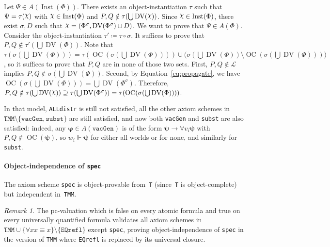 \documentclass[11pt]{article}
\DeclareRobustCommand{\Chi}{{\mathpalette\irchi\relax}}
\newcommand*{\irchi}[2]{\raisebox{\depth}{$#1\chi$}}%
\renewcommand*{\phi}{\varphi}
\newcommand*{\calL}{\mathcal{L}}
\DeclareMathOperator{\DV}{DV}
\DeclareMathOperator{\OC}{OC}
\DeclareMathOperator{\Inst}{Inst}
\theoremstyle{plain}
\theoremstyle{definition}
\theoremstyle{remark}
\newtheorem{remark}[theorem]{Remark}
\begin{document}
Let $\Psi \in A(\Inst(\Phi))$.
There exists an object-instantiation $\tau$ such that $\Psi = \tau(\Chi)$ with $\Chi \in \Inst(\Phi)$
and $P, Q \notin \tau(\bigcup \DV(\Chi))$.
Since $\Chi \in \Inst(\Phi)$, there exist $\sigma, D$ such that
$\Chi = (\Phi^\sigma, \DV(\Phi^\sigma) \cup D)$.
We want to prove that $\Psi \in A(\Phi)$.
Consider the object-instantiation $\tau' \coloneqq \tau \circ \sigma$.
It suffices to prove that $P, Q \notin \tau'(\bigcup \DV(\Phi))$.
Note that $\tau(\sigma(\bigcup \DV(\Phi))) = \tau(\OC(\sigma(\bigcup \DV(\Phi)))) \cup
\bigl( \sigma(\bigcup \DV(\Phi)) \setminus \OC(\sigma(\bigcup \DV(\Phi))) \bigr)$,
so it suffices to prove that $P, Q$ are in none of those two sets.
First, $P, Q \notin \calL$ implies $P, Q \notin \sigma(\bigcup \DV(\Phi))$.
Second, by Equation~\eqref{eq:propagate}, we have
$\OC(\sigma(\bigcup \DV(\Phi))) = \bigcup \DV(\Phi^\sigma)$.
Therefore, $P, Q \notin \tau(\bigcup \DV(\Chi)) \supseteq \tau(\bigcup \DV(\Phi^\sigma))
= \tau(\OC(\sigma(\bigcup \DV(\Phi))))$.



In that model, \texttt{ALLdistr} is still not satisfied, all the other axiom schemes in
$\texttt{TMM} \setminus \{\texttt{vacGen}, \texttt{subst}\}$ are still satisfied, and now both
\texttt{vacGen} and \texttt{subst} are also satisfied: indeed, any $\bm\phi \in A(\texttt{vacGen})$
is of the form $\bm\psi \to \forall v_i \bm\psi$ with $P, Q \notin \OC(\bm\psi)$, so
$w_i \Vdash \bm\psi$ for either all worlds or for none, and similarly for \texttt{subst}.


\paragraph{Object-independence of \texttt{spec}}

The axiom scheme \texttt{spec} is object-provable from~\texttt{T} (since~\texttt{T} is
object-complete) but independent in~\texttt{TMM}.

\begin{remark}
The pc-valuation which is false on every atomic formula and true on every universally quantified
formula validates all axiom schemes in
$\texttt{TMM} \cup \{ \forall x x \equiv x \} \setminus \{ \texttt{EQrefl} \}$ except \texttt{spec},
proving object-independence of \texttt{spec} in the version of \texttt{TMM} where \texttt{EQrefl} is
replaced by its universal closure.
\end{remark}
\end{document}
